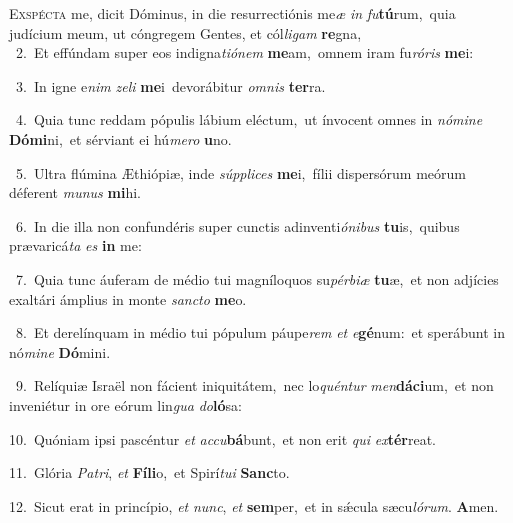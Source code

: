 \lettrine{\initial\textcolor{\initialcolor}{E}}{xspécta} me, dicit Dóminus, in die resurrectiónis me\textit{æ} \textit{in} \textit{fu}\-\textbf{tú}rum,~\star quia judícium meum, ut cóngregem Gentes, et cól\-\textit{li}\-\textit{gam} \textbf{re}\-gna,\\
{\numbfont\textcolor{\numbcolor}{~2.}}~Et effúndam super eos indigna\-\textit{ti}\-\textit{ó}\textit{nem} \textbf{me}\-am,~\star omnem iram fu\-\textit{ró}\-\textit{ris} \textbf{me}\-i:\par
{\numbfont\textcolor{\numbcolor}{~3.}}~In igne e\textit{nim} \textit{ze}\-\textit{li} \textbf{me}\-i~\star devorábitur \textit{om}\-\textit{nis} \textbf{ter}\-ra.\par
{\numbfont\textcolor{\numbcolor}{~4.}}~Quia tunc reddam pópulis lábium eléctum,~\dagger ut ínvocent omnes in \textit{nó}\-\textit{mi}\textit{ne} \textbf{Dó}\-\textbf{mi}ni,~\star et sérviant ei hú\-\textit{me}\-\textit{ro} \textbf{u}\-no.\par
{\numbfont\textcolor{\numbcolor}{~5.}}~Ultra flúmina Æthiópiæ, inde \textit{súp}\-\textit{pli}\textit{ces} \textbf{me}\-i,~\star fílii dispersórum meórum déferent \textit{mu}\-\textit{nus} \textbf{mi}\-hi.\par
{\numbfont\textcolor{\numbcolor}{~6.}}~In die illa non confundéris super cunctis adinventi\-\textit{ó}\-\textit{ni}\textit{bus} \textbf{tu}\-is,~\star quibus prævaricá\textit{ta} \textit{es} \textbf{in} me:\par
{\numbfont\textcolor{\numbcolor}{~7.}}~Quia tunc áuferam de médio tui magníloquos su\-\textit{pér}\-\textit{bi}\textit{æ} \textbf{tu}\-æ,~\star et non adjícies exaltári ámplius in monte \textit{sanc}\-\textit{to} \textbf{me}\-o.\par
{\numbfont\textcolor{\numbcolor}{~8.}}~Et derelínquam in médio tui pópulum páupe\textit{rem} \textit{et} \textit{e}\-\textbf{gé}num:~\star et sperábunt in nó\-\textit{mi}\-\textit{ne} \textbf{Dó}\-mini.\par
{\numbfont\textcolor{\numbcolor}{~9.}}~Relíquiæ Israël non fácient iniquitátem,~\dagger nec lo\-\textit{quén}\-\textit{tur} \textit{men}\-\textbf{dá}\textbf{ci}um,~\star et non inveniétur in ore eórum lin\textit{gua} \textit{do}\-\textbf{ló}sa:\par
{\numbfont\textcolor{\numbcolor}{10.}}~Quóniam ipsi pascéntur \textit{et} \textit{ac}\-\textit{cu}\textbf{bá}bunt,~\star et non erit \textit{qui} \textit{ex}\-\textbf{tér}reat.\par
{\numbfont\textcolor{\numbcolor}{11.}}~Glória \textit{Pa}\-\textit{tri}, \textit{et} \textbf{Fí}\-\textbf{li}o,~\star et Spirí\-\textit{tu}\-\textit{i} \textbf{Sanc}\-to.\par
{\numbfont\textcolor{\numbcolor}{12.}}~Sicut erat in princípio, \textit{et} \textit{nunc}\-, \textit{et} \textbf{sem}\-per,~\star et in sǽcula sæcu\-\textit{ló}\-\textit{rum}. \textbf{A}\-men.\par
